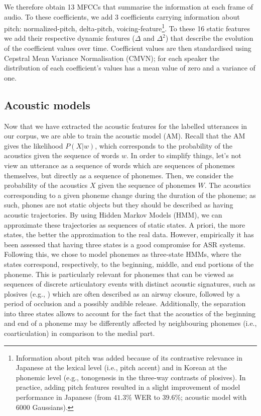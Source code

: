 We therefore obtain 13 MFCCs that summarise the information at each frame of audio. To these coefficients, we add 3 coefficients carrying information about pitch: normalized-pitch, delta-pitch, voicing-feature\footnote{Information about pitch was added because of its contrastive relevance in Japanese at the lexical level (i.e., pitch accent) and in Korean at the phonemic level (e.g., tonogenesis in the three-way contrasts of plosives). In practice, adding pitch features resulted in a slight improvement of model performance in Japanese (from $41.3\%$ WER to $39.6\%$; acoustic model with 6000 Gaussians).}.
To these 16 static features we add their respective dynamic features ($\Delta$ and $\Delta^2$) that describe the evolution of the coefficient values over time. 
Coefficient values are then standardised using Cepstral Mean Variance Normalisation (CMVN); for each speaker the distribution of each coefficient's values has a mean value of zero and a variance of one. 

\subsection{Acoustic models}

Now that we have extracted the acoustic features for the labelled utterances in our corpus, we are able to train the acoustic model (AM). Recall that the AM gives the likelihood $P(X|w)$, which corresponds to the probability of the acoustics given the sequence of words $w$.
In order to simplify things, let's not view an utterance as a sequence of words which are sequences of phonemes themselves, but directly as a sequence of phonemes. Then, we consider the probability of the acoustics $X$ given the sequence of phonemes $W$.
The acoustics corresponding to a given phoneme change during the duration of the phoneme; as such, phones are not static objects but they should be described as having acoustic trajectories. By using Hidden Markov Models (HMM), we can approximate these trajectories as sequences of static states. A priori, the more states, the better the approximation to the real data. However, empirically it has been assessed that having three states is a good compromise for ASR systems. Following this, we chose to model phonemes as three-state HMMs, where the states correspond, respectively, to the beginning, middle, and end portions of the phoneme. This is particularly relevant for phonemes that can be viewed as sequences of discrete articulatory events with distinct acoustic signatures, such as plosives (e.g., ) which are often described as an airway closure, followed by a period of occlusion and a possibly audible release. Additionally, the separation into three states allows to account for the fact that the acoustics of the beginning and end of a phoneme may be differently affected by neighbouring phonemes (i.e., coarticulation) in comparison to the medial part. 

